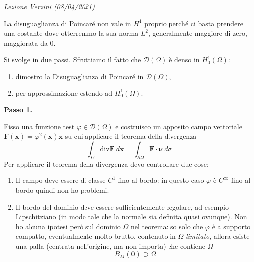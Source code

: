 \documentclass[10pt,a4paper,twoside,openright]{book}
\newcommand{\x}{\mathbf{x}}
\newcommand{\zer}{\mathbf{0}}
\newcounter{conteggioV}
\newcommand{\LezioneV}[1]{
	\stepcounter{conteggioV}
	\textit{Lezione Verzini \arabic{conteggioV} (#1)}
	}
\begin{document}
\LezioneV{08/04/2021}
\begin{oss}
	La disuguaglianza di Poincaré non vale in $H^{1} $ proprio perché ci basta prendere una costante dove otterremmo la sua norma $L^2$, generalmente maggiore di zero, maggiorata da $0$.
\end{oss}
\begin{dimostrazione}
	Si svolge in due passi. Sfruttiamo il fatto che $\mathcal{D}( \Omega )$ è denso in $H_{0}^{1}( \Omega )$:
	\begin{enumerate}
		\item dimostro la Disuguaglianza di Poincaré in $\mathcal{D}( \Omega )$,
		\item per approssimazione estendo ad $H_{0}^{1}( \Omega )$.
	\end{enumerate}
	
	\textbf{Passo 1.}
	
	Fisso una funzione test $\varphi \in \mathcal{D}( \Omega )$ e costruisco un apposito campo vettoriale $\boxed{\mathbf{F}(\x) =\varphi ^{2}(\x)\x}$ su cui applicare il teorema della divergenza
	\begin{equation*}
		\int _{\Omega }\mathrm{div}\mathbf{F} \ d\x =\int _{\partial \Omega }\mathbf{F} \cdotp \bm{\nu } \ d\sigma 
	\end{equation*}
	Per applicare il teorema della divergenza devo controllare due cose:
	\begin{enumerate}
		\item Il campo deve essere di classe $C^{1}$ fino al bordo: in questo caso $\varphi $ è $C^{\infty }$ fino al bordo quindi non ho problemi.
		\item Il bordo del dominio deve essere sufficientemente regolare, ad esempio Lipschitziano (in modo tale che la normale sia definita quasi ovunque). Non ho alcuna ipotesi però sul dominio $\Omega $ nel teorema: so solo che $\varphi $ è a supporto compatto, eventualmente molto brutto, contenuto in $\Omega $ \textit{limitato}, allora esiste una palla (centrata nell'origine, ma non importa) che contiene $\Omega $
		      \begin{equation*}
		      	B_{M}(\zer) \supset \Omega 
		      \end{equation*}
		      
		      \begin{figure}[H]
		      	\centering
		      	
		      	\begin{tikzpicture}[x=0.75pt,y=0.75pt,yscale=-1,xscale=1]
		      		

\end{tikzpicture}
\end{figure}
\end{enumerate}
\end{dimostrazione}
\end{document}
